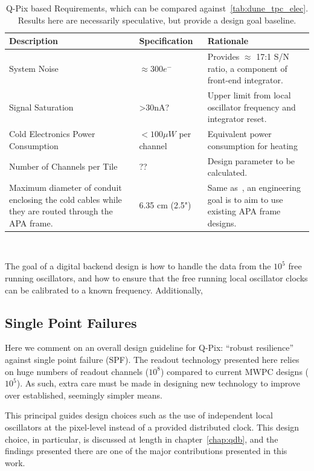 \begin{table}
\begin{center}
\begin{tabular}{|| p{50mm} | p{50mm} | p{50mm} ||}
 \hline
 Description & Specification & Rationale \\ [0.5ex]
 \hline\hline
  System Noise & $\approx 300 e^{-}$ & Provides $\approx$ 17:1 S/N ratio, a component of front-end integrator. \\
 \hline
  Signal Saturation & >30\unit{nA}? & Upper limit from local oscillator frequency and integrator reset. \\
 \hline
  Cold Electronics Power Consumption &  $< 100 \unit{\mu W}$ per channel & Equivalent power consumption for heating \\
 \hline
  Number of Channels per Tile & ?? &  Design parameter to be calculated. \\
 \hline
Maximum diameter of conduit enclosing the cold cables while they are routed through the APA frame. & 6.35 cm (2.5") & Same as~\citep{DUNE-FD_TDRv4:Abi_2020}, an engineering goal is to aim to use existing APA frame designs. \\
 \hline
\end{tabular}
\caption{Q-Pix based Requirements, which can be compared against~\ref{tab:dune_tpc_elec}. Results here are necessarily speculative, but provide a design goal baseline.}
\end{center}
\end{table}~\label{tab:qpix_tpc_elec}

The goal of a digital backend design is how to handle the data from the $10^{5}$ free running oscillators, and how to ensure that the free running local oscillator clocks can be calibrated to a known frequency.
Additionally,

\subsection{Single Point Failures}

Here we comment on an overall design guideline for Q-Pix: ``robust resilience'' against single point failure (SPF).
The readout technology presented here relies on huge numbers of readout channels ($10^{8}$) compared to current MWPC designs ($10^{5}$).
As such, extra care must be made in designing new technology to improve over established, seemingly simpler means.

This principal guides design choices such as the use of independent local oscillators at the pixel-level instead of a provided distributed clock.
This design choice, in particular, is discussed at length in chapter~\ref{chap:qdb}, and the findings presented there are one of the major contributions presented in this work.

